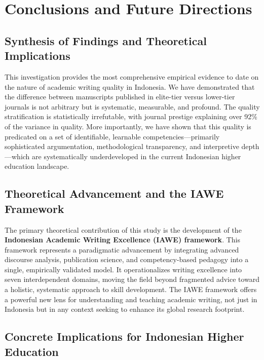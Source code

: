 \documentclass[journal,article,submit,pdftex,moreauthors]{Definitions/mdpi}
\begin{document}
\section{Conclusions and Future Directions}

\subsection{Synthesis of Findings and Theoretical Implications}

This investigation provides the most comprehensive empirical evidence to date on the nature of academic writing quality in Indonesia. We have demonstrated that the difference between manuscripts published in elite-tier versus lower-tier journals is not arbitrary but is systematic, measurable, and profound. The quality stratification is statistically irrefutable, with journal prestige explaining over 92\% of the variance in quality. More importantly, we have shown that this quality is predicated on a set of identifiable, learnable competencies—primarily sophisticated argumentation, methodological transparency, and interpretive depth—which are systematically underdeveloped in the current Indonesian higher education landscape.

\subsection{Theoretical Advancement and the IAWE Framework}

The primary theoretical contribution of this study is the development of the \textbf{Indonesian Academic Writing Excellence (IAWE) framework}. This framework represents a paradigmatic advancement by integrating advanced discourse analysis, publication science, and competency-based pedagogy into a single, empirically validated model. It operationalizes writing excellence into seven interdependent domains, moving the field beyond fragmented advice toward a holistic, systematic approach to skill development. The IAWE framework offers a powerful new lens for understanding and teaching academic writing, not just in Indonesia but in any context seeking to enhance its global research footprint.

\subsection{Concrete Implications for Indonesian Higher Education}
\end{document}
